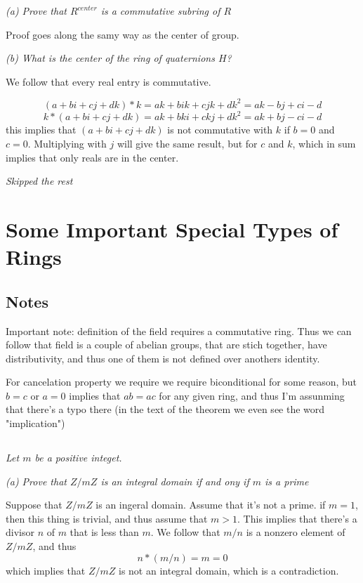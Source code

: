 \documentclass[11pt,oneside,titlepage]{book}
\begin{document}
\textit{(a) Prove that $R^{center}$ is a commutative subring of $R$}

Proof goes along the samy way as the center of group.

\textit{(b) What is the center of the ring of quaternions $H$?}

We follow that every real entry is commutative.

$$(a + bi + cj + dk) * k = ak + bik + cjk + dk^2 = ak - bj + ci - d$$
$$k * (a + bi + cj + dk) = ak + bki + ckj + dk^2 = ak + bj - ci - d$$
this implies that $(a + bi + cj + dk)$ is not commutative with $k$ if
$b = 0$ and $c = 0$. Multiplying with $j$ will give the same result,
but for $c$ and $k$, which in sum implies that only reals are in the
center.

\textit{Skipped the rest}

\section{Some Important Special Types of Rings}

\subsection*{Notes}

Important note: definition of the field requires a commutative
ring. Thus we can follow that field is a couple of abelian groups,
that are stich together, have distributivity, and thus one of them is
not defined over anothers identity.

For cancelation property we require we require biconditional for some
reason, but $b = c$ or $a = 0$ implies that $ab = ac$ for any given
ring, and thus I'm assunming that there's a typo there (in the text
of the theorem we even see the word "implication")

\subsection{}

\textit{Let $m$ be a positive integet.}

\textit{(a) Prove that $Z/mZ$ is an integral domain if and ony if $m$
  is a prime}

Suppose that $Z/mZ$ is an ingeral domain. Assume that it's not a
prime.  if $m = 1$, then this thing is trivial, and thus assume that
$m > 1$.  This implies that there's a divisor $n$ of $m$ that is less
than $m$.  We follow that $m / n$ is a nonzero element of $Z/mZ$, and
thus
$$n * (m / n) = m = 0$$
which implies that $Z/mZ$ is not an integral domain, which is a
contradiction.
\end{document}
